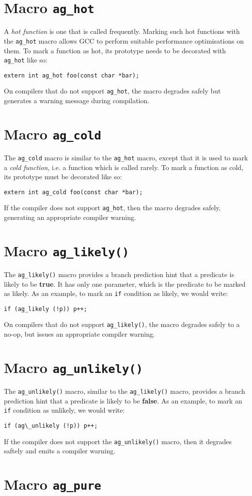 \section{Macro \texttt{ag\_hot}}
A \emph{hot function} is one that is called frequently. Marking such hot
functions with the \verb|ag_hot| macro allows GCC to perform suitable
performance optimisations on them. To mark a function as hot, its prototype
needs to be decorated with \verb|ag_hot| like so:
\begin{lstlisting}[linewidth=1.0\linewidth]
extern int ag_hot foo(const char *bar);
\end{lstlisting}

On compilers that do not support \verb|ag_hot|, the macro degrades safely
but generates a warning message during compilation.


\section{Macro \texttt{ag\_cold}}
The \verb|ag_cold| macro is similar to the \verb|ag_hot| macro, except
that it is used to mark a \emph{cold function}, i.e. a function which is called
rarely. To mark a function as cold, its prototype must be decorated like so:
\begin{lstlisting}[linewidth=1.0\linewidth]
extern int ag_cold foo(const char *bar);
\end{lstlisting}

If the compiler does not support \texttt{ag\_hot}, then the macro degrades
safely, generating an appropriate compiler warning.

\section{Macro \texttt{ag\_likely()}}
The \verb|ag_likely()| macro provides a branch prediction hint that a predicate
is likely to be \textbf{true}. It has only one parameter, which is the predicate 
to be marked as likely. As an example, to mark an \verb|if| condition as likely, 
we would write:
\begin{lstlisting}[linewidth=1.0\linewidth]
if (ag_likely (!p)) p++;
\end{lstlisting}

On compilers that do not support \verb|ag_likely()|, the macro degrades safely
to a no-op, but issues an appropriate compiler warning.

\section{Macro \texttt{ag\_unlikely()}}
The \verb|ag_unlikely()| macro, similar to the \verb|ag_likely()| macro,
provides a branch prediction hint that a predicate is likely to be 
\textbf{false}. As an example, to mark an \verb|if| condition as unlikely, we 
would write:
\begin{lstlisting}[linewidth=1.0\linewidth]
if (ag\_unlikely (!p)) p++;
\end{lstlisting}

If the compiler does not support the \verb|ag_unlikely()| macro, then it
degrades saftely and emits a compiler warning.

\section{Macro \texttt{ag\_pure}}

